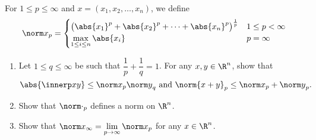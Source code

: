 \documentclass[12pt]{article}
\begin{document}
\begin{problem} \label{prb:lp}
    For $1 \le p \le \infty$ and $x = (x_1, x_2, \dots, x_n)$, we define \[
        {\norm x}_p = \begin{cases}
            \big(\abs{x_1}^p + \abs{x_2}^p + \dots + \abs{x_n}^p\big)^{\frac1p} & 1 \le p < \infty \\
            \max\limits_{1 \le i \le n} \abs{x_i} & p = \infty
        \end{cases}
    \]
    \begin{enumerate}
        \item Let $1 \le q \le \infty$ be such that $\dfrac1p + \dfrac1q = 1$.
            For any $x, y \in \R^n$, show that \begin{equation}
                \abs{\innerp xy} \le {\norm x}_p {\norm y}_q
                \text{ and }
                {\norm {x + y}}_p \le {\norm x}_p + {\norm y}_p.
                \label{eq:holder-norm}
            \end{equation}
        \item Show that ${\norm \cdot}_p$ defines a norm on $\R^n$.
        \item Show that ${\norm x}_\infty = \lim\limits_{p \to \infty} {\norm x}_p$
            for any $x \in \R^n$.
    \end{enumerate}
\end{problem}
\end{document}

